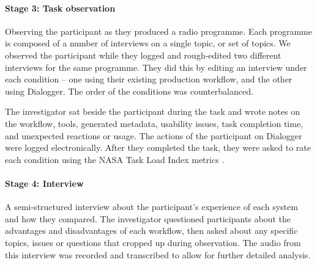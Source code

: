 \paragraph{Stage 3: Task observation}
    Observing the participant as they produced a radio programme.  Each programme is composed of a number of interviews
    on a single topic, or set of topics.  We observed the participant while they logged and rough-edited two
    different interviews for the same programme. They did this by editing an interview under each condition -- one
    using their existing production workflow, and the other using Dialogger. The order of the conditions was
    counterbalanced.

    The investigator sat beside the participant during the task and wrote notes on the workflow, tools, generated
    metadata, usability issues, task completion time, and unexpected reactions or usage.
    The actions of the participant on Dialogger were logged electronically. After they completed the task, they were
    asked to rate each condition using the NASA Task Load Index metrics \citep{Hart1988}.


\paragraph{Stage 4: Interview}
    A semi-structured interview about the participant's experience of each system and how they compared. The
    investigator questioned participants about the advantages and disadvantages of each workflow, then asked about any
    specific topics, issues or questions that cropped up during observation. The audio from this interview was recorded
    and transcribed to allow for further detailed analysis.


